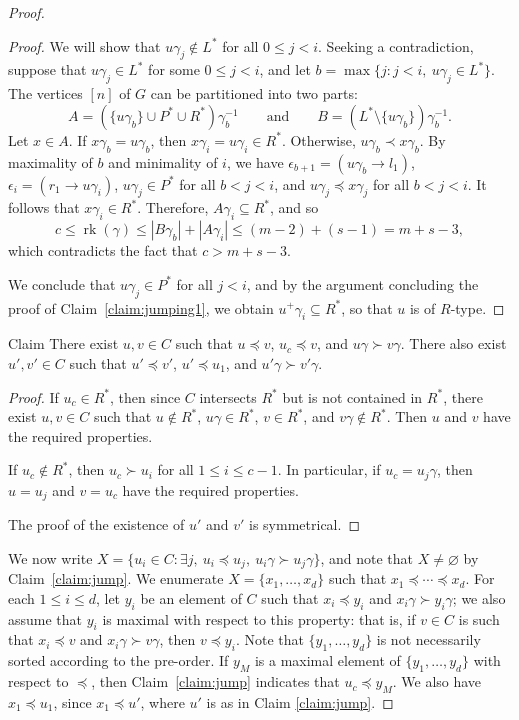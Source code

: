 \documentclass[ALCO,ThmDefs,Unicode,epreuves]{cedram}
\DeclareMathOperator{\rk}{rk}
\newcommand{\set}[2]{\{#1:#2\}}
\newcommand{\nset}{[n]}
\newenvironment{claim}{\begin{enonce}{Claim}}{\end{enonce}}
\begin{document}
\begin{proof}
\begin{proof}
 We will show that $u\gamma_j \not\in L^*$ for all $0 \leq j < i$. Seeking a
 contradiction, suppose that $u\gamma_j\in L^*$ for some $0\leq j < i$, and
 let $b = \max\{j : j < i,\ u\gamma_j \in L^*\}$. The vertices $\nset$ of $G$ can be partitioned into two parts:
 \[A = (\{u\gamma_b\} \cup
 P^* \cup R^*) \gamma_b^{-1} \qquad\text{and}\qquad B
 = (L^* \setminus \{u\gamma_b\}) \gamma_b^{-1}.\]
 Let $x \in A$. If $x \gamma_b = u \gamma_b$, then $x \gamma_i = u \gamma_i
 \in R^*$. Otherwise, $u \gamma_b \prec x \gamma_b$.
 By maximality of $b$ and minimality of $i$, we have $\epsilon_{b+1}=(u\gamma_b\to l_1)$, $\epsilon_i=(r_1\to u\gamma_i)$, $u\gamma_j\in P^*$ for all $b<j<i$, and $u\gamma_j\preceq x\gamma_j$ for all $b<j<i$. It follows that $x\gamma_i\in R^*$.
%
 Therefore, $A\gamma_i \subseteq R ^*$, and so 
 \[c \le \rk(\gamma) \le |B \gamma_b| + |A \gamma_i| \le (m-2) + (s-1) = m + s
 - 3,\]
 which contradicts the fact that $c > m+s-3$. 

 We conclude that $u\gamma_j \in P^*$ for all $j < i$, and by the argument
 concluding the proof of Claim~\ref{claim:jumping1}, we obtain $u^+\gamma_i
 \subseteq R^*$, so that $u$ is of $R$-type.
\end{proof} 


\begin{claim} \label{claim:jump}
 There exist $u, v \in C$ such that $u\preceq v$, $u_c\preceq v$, and $u\gamma
 \succ v\gamma$. There also exist $u', v' \in C$ such that $u'\preceq v'$,
 $u' \preceq u_1$, and $u'\gamma \succ v'\gamma$. 
\end{claim}

\begin{proof}
 If $u_c \in R^*$, then since $C$ intersects $R^*$ but is not contained in
 $R^*$, there exist $u, v \in C$ such that $u \notin R^*$, $u \gamma \in
 R^*$, $v \in R^*$, and $v \gamma \notin R^*$. Then $u$ and $v$ have the
 required properties.

 If $u_c \notin R^*$, then $u_c \succ u_i$ for all $1 \le i \le c-1$. In
 particular, if $u_c=u_j\gamma$, then $u = u_j$ and $v = u_c$ have the
 required properties.

The proof of the existence of $u'$ and $v'$ is symmetrical.
\end{proof}

We now write $X = \set{u_i \in C}{\exists j,\ u_i\preceq u_j,\ u_i\gamma \succ
u_j\gamma}$, and note that $X\not=\varnothing$ by Claim~\ref{claim:jump}.
%
We enumerate $X = \{x_1, \dots, x_d\}$ such that $x_1 \preceq\cdots\preceq x_d$. For each $1\leq i\leq d$,
let $y_i$ be an element of $C$ such that $x_i\preceq y_i$ and $x_i\gamma
\succ y_i\gamma$; we also assume that $y_i$ is maximal with respect to this property: that is, if $v\in C$ is such that $x_i\preceq v$ and $x_i\gamma \succ v\gamma$,
then $v \preceq y_i$. Note that $\{y_1, \ldots, y_d\}$ is not necessarily
sorted according to the pre-order. If $y_M$ is a maximal element of $\{y_1,
\ldots, y_d\}$ with respect to $\preceq$, then Claim~\ref{claim:jump} indicates
that $u_c \preceq y_M$. We also have $x_1 \preceq u_1$, since $x_1\preceq u'$, where $u'$ is as in Claim \ref{claim:jump}.


\end{proof}
\end{document}
